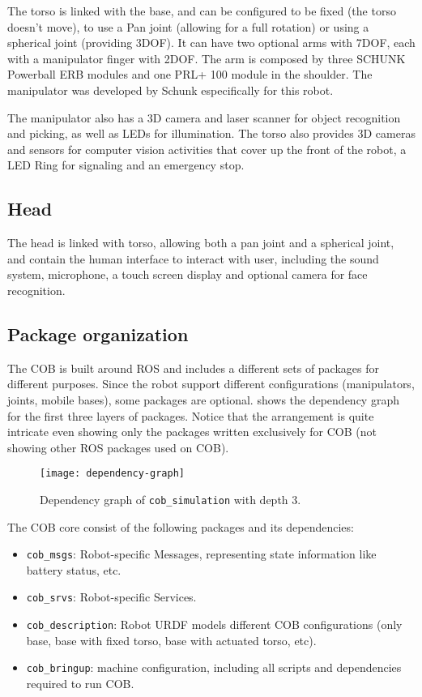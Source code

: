 The torso is linked with the base, and can be configured to be fixed (the torso doesn't move), to use a Pan joint (allowing for a full rotation) or using a spherical joint (providing 3DOF). It can have two optional arms with 7DOF, each with a manipulator finger with 2DOF. The arm is composed by three SCHUNK Powerball ERB modules and one PRL+ 100 module  in  the  shoulder. The manipulator was developed by Schunk especifically for this robot.

The manipulator also has a 3D camera and laser scanner for object recognition and picking, as well as LEDs for illumination. The torso also provides 3D cameras and sensors for computer vision activities that cover up the front of the robot, a LED Ring for signaling and an emergency stop.

\subsection{Head}

The head is linked with torso, allowing both a pan joint and a spherical joint, and contain the human interface to interact with user, including the sound system, microphone, a touch screen display and optional camera for face recognition.


\subsection{Package organization}

The COB is built around ROS and includes a different sets of packages for different purposes. Since the robot support different configurations (manipulators, joints, mobile bases), some packages are optional.  shows the dependency graph for the first three layers of packages. Notice that the arrangement is quite intricate even showing only the packages written exclusively for COB (not showing other ROS packages used on COB).

\begin{figure}[!ht]
\centering
\texttt{[image: dependency-graph]}
\caption{Dependency graph of \texttt{cob\_simulation} with depth 3.}
\label{fig:dependency-graph}
\end{figure}


The COB core consist of the following packages and its dependencies:

\begin{itemize}
\item \texttt{cob\_msgs}: Robot-specific Messages, representing state information like battery status, etc.
\item \texttt{cob\_srvs}: Robot-specific Services.
\item \texttt{cob\_description}: Robot URDF models different COB configurations (only base, base with fixed torso, base with actuated torso, etc).
\item \texttt{cob\_bringup}: machine configuration, including all scripts and dependencies required to run COB.
\end{itemize}


